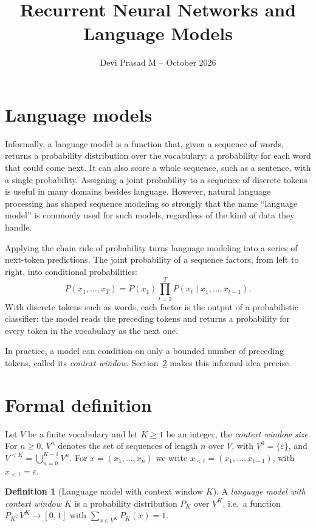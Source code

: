 \documentclass[12pt]{article}
\title{Recurrent Neural Networks and Language Models}
\author{Devi Prasad M -- October 2026}
\date{}
\theoremstyle{definition}
\newtheorem{definition}{Definition}
\theoremstyle{remark}
\begin{document}
\maketitle

\section{Language models}
\label{sec:lm-intro}

Informally, a language model is a function that, given a
sequence of words, returns a probability distribution over
the vocabulary: a probability for each word that could come
next. It can also score a whole sequence, such as a
sentence, with a single probability. Assigning a joint
probability to a sequence of discrete tokens is useful in
many domains besides language. However, natural language
processing has shaped sequence modeling so strongly that the
name ``language model'' is commonly used for such models,
regardless of the kind of data they handle.

Applying the chain rule of probability turns language
modeling into a series of next-token predictions. The
joint probability of a sequence factors, from left to right,
into conditional probabilities:
\[
P(x_1, \ldots, x_T) = P(x_1) \prod_{t=2}^{T} P(x_t \mid x_1, \ldots, x_{t-1}).
\]
With discrete tokens such as words, each factor is the
output of a probabilistic classifier: the model reads
the preceding tokens and returns a probability for every
token in the vocabulary as the next one.

In practice, a model can condition on only a bounded
number of preceding tokens, called its
\emph{context window}. Section~\ref{sec:lm-formal} makes
this informal idea precise.

\section{Formal definition}
\label{sec:lm-formal}

Let \(V\) be a finite vocabulary and let \(K \ge 1\)
be an integer, the \emph{context window size}. For
\(n \ge 0\), \(V^n\) denotes the set of sequences of
length \(n\) over \(V\), with \(V^0 = \{\varepsilon\}\),
and \(V^{<K} = \bigcup_{n=0}^{K-1} V^n\). For
\(x = (x_1, \dots, x_n)\) we write
\(x_{<t} = (x_1, \dots, x_{t-1})\),
with \(x_{<1} = \varepsilon\).

\begin{definition}[Language model with context window \(K\)]
A \emph{language model with context window \(K\)} is
a probability distribution \(P_K\) over \(V^K\),
i.e.\ a function \(P_K : V^K \to [0,1]\) with
\(\sum_{x \in V^K} P_K(x) = 1\).
\end{definition}
\end{document}
